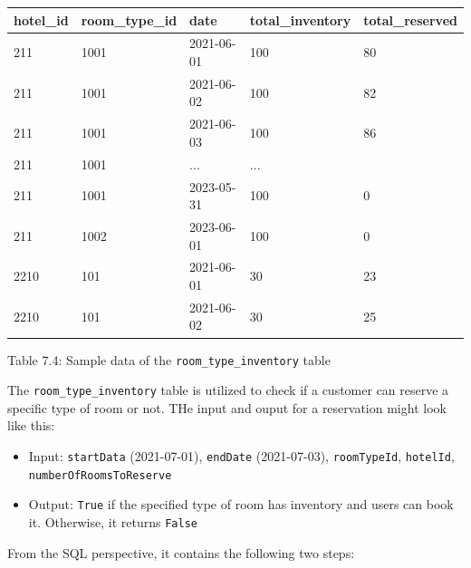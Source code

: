 \documentclass{report}
\theoremstyle{definition}
\begin{document}
\begin{tabular}{|p{2cm}|p{3cm}|p{2.2cm}|p{3cm}|p{3cm}|}
\hline
\textbf{hotel\_id} & \textbf{room\_type\_id} & \textbf{date} & \textbf{total\_inventory} & \textbf{total\_reserved} \\
\hline
211 & 1001 & 2021-06-01 & 100 & 80 \\
\hline
211 & 1001 & 2021-06-02 & 100 & 82 \\
\hline
211 & 1001 & 2021-06-03 & 100 & 86 \\
\hline
211 & 1001 & ... & ... & \\
\hline
211 & 1001 & 2023-05-31 & 100 & 0 \\
\hline
211 & 1002 & 2023-06-01 & 100 & 0 \\
\hline
2210 & 101 & 2021-06-01 & 30 & 23 \\
\hline
2210 & 101 & 2021-06-02 & 30 & 25 \\
\hline
\end{tabular}

Table 7.4: Sample data of the \lstinline|room_type_inventory| table

The \lstinline|room_type_inventory| table is utilized to check if a customer can reserve a specific type of room or not. THe input and ouput for a reservation might look like this:

\begin{itemize}
\item
Input: \lstinline|startData| (2021-07-01), \lstinline|endDate| (2021-07-03), \lstinline|roomTypeId|, \lstinline|hotelId|, \lstinline|numberOfRoomsToReserve|
\item
Output: \lstinline|True| if the specified type of room has inventory and users can book it. Otherwise, it returns \lstinline|False|
\end{itemize}

From the SQL perspective, it contains the following two steps:
\end{document}
